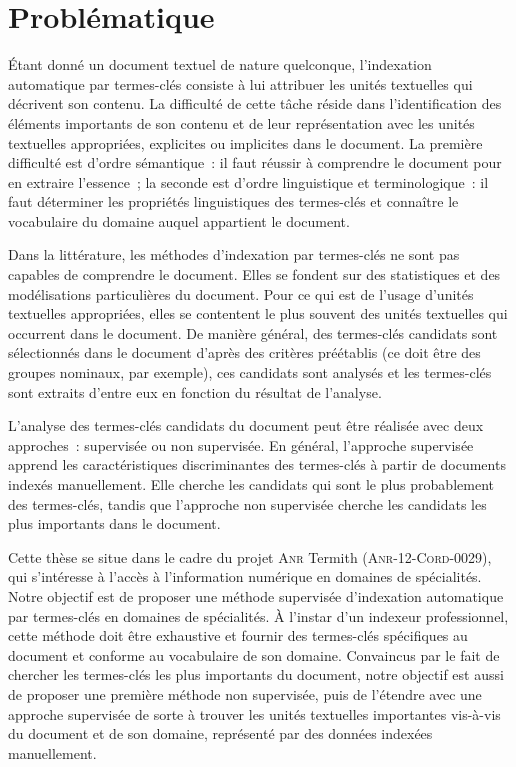 
  \section{Problématique}
  \label{sec:main-introduction-problem_statement}
    Étant donné un document textuel de nature quelconque, l'indexation
    automatique par termes-clés consiste à lui attribuer les unités textuelles
    qui décrivent son contenu. La difficulté de cette tâche réside dans
    l'identification des éléments importants de son contenu et de leur
    représentation avec les unités textuelles appropriées, explicites ou
    implicites dans le document. La première difficulté est d'ordre sémantique~:
    il faut réussir à comprendre le document pour en extraire l'essence~; la
    seconde est d'ordre linguistique et terminologique~: il faut déterminer les
    propriétés linguistiques des termes-clés et connaître le vocabulaire du
    domaine auquel appartient le document.

    Dans la littérature, les méthodes d'indexation par termes-clés ne sont pas
    capables de comprendre le document. Elles se fondent sur des statistiques et
    des modélisations particulières du document. Pour ce qui est de l'usage
    d'unités textuelles appropriées, elles se contentent le plus souvent des
    unités textuelles qui occurrent dans le document. De manière général, des
    termes-clés candidats sont sélectionnés dans le document d'après des
    critères préétablis (ce doit être des groupes nominaux, par exemple), ces
    candidats sont analysés et les termes-clés sont extraits d'entre eux en
    fonction du résultat de l'analyse.

    L'analyse des termes-clés candidats du document peut être réalisée avec deux
    approches~: supervisée ou non supervisée. En général, l'approche supervisée
    apprend les caractéristiques discriminantes des termes-clés à partir de
    documents indexés manuellement. Elle cherche les candidats qui sont le plus
    probablement des termes-clés, tandis que l'approche non supervisée cherche
    les candidats les plus importants dans le document.

    Cette thèse se situe dans le cadre du projet \textsc{Anr} Termith
    (\textsc{Anr-12-Cord-0029}), qui s'intéresse à l'accès à l'information
    numérique en domaines de spécialités. Notre objectif est de proposer une
    méthode supervisée d'indexation automatique par termes-clés en domaines de
    spécialités. À l'instar d'un indexeur professionnel, cette méthode doit être
    exhaustive et fournir des termes-clés spécifiques au document et conforme au
    vocabulaire de son domaine. Convaincus par le fait de chercher les
    termes-clés les plus importants du document, notre objectif est aussi de
    proposer une première méthode non supervisée, puis de l'étendre avec une
    approche supervisée de sorte à trouver les unités textuelles importantes
    vis-à-vis du document et de son domaine, représenté par des données indexées
    manuellement.

